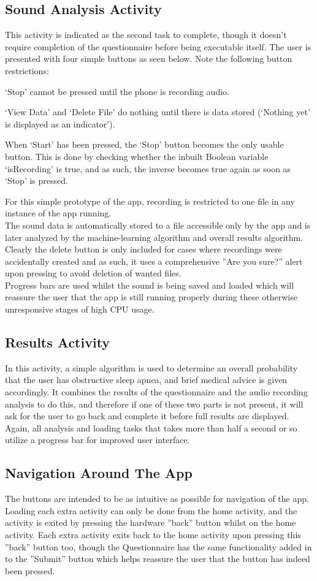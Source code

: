 \subsection{Sound Analysis Activity}
This activity is indicated as the second task to complete, though it doesn’t require completion of the questionnaire before being executable itself. The user is presented with four simple buttons as seen below. Note the following button restrictions:
\begin{itemise}
\item ‘Stop’ cannot be pressed until the phone is recording audio.
\item ‘View Data’ and ‘Delete File’ do nothing until there is data stored (‘Nothing yet’ is displayed as an indicator’).
\item When ‘Start’ has been pressed, the ‘Stop’ button becomes the only usable button. This is done by checking whether the inbuilt Boolean variable ‘isRecording’ is true, and as such, the inverse becomes true again as soon as ‘Stop’ is pressed.
\end{itemise}
For this simple prototype of the app, recording is restricted to one file in any instance of the app running.
\\ The sound data is automatically stored to a file accessible only by the app and is later analyzed by the machine-learning algorithm and overall results algorithm. Clearly the delete button is only included for cases where recordings were accidentally created and as such, it uses a comprehensive ''Are you sure?'' alert upon pressing to avoid deletion of wanted files.
\\Progress bars are used whilst the sound is being saved and loaded which will reassure the user that the app is still running properly during these otherwise unresponsive stages of high CPU usage. 
\subsection{Results Activity}
In this activity, a simple algorithm is used to determine an overall probability that the user has obstructive sleep apnea, and brief medical advice is given accordingly. It combines the results of the questionnaire and the audio recording analysis to do this, and therefore if one of these two parts is not present, it will ask for the user to go back and complete it before full results are displayed. Again, all analysis and loading tasks that takes more than half a second or so utilize a progress bar for improved user interface.
\subsection{Navigation Around The App}
The buttons are intended to be as intuitive as possible for navigation of the app. Loading each extra activity can only be done from the home activity, and the activity is exited by pressing the hardware ''back'' button whilst on the home activity. Each extra activity exits back to the home activity upon pressing this ''back'' button too, though the Questionnaire has the same functionality added in to the ''Submit'' button which helps reassure the user that the button has indeed been pressed.
